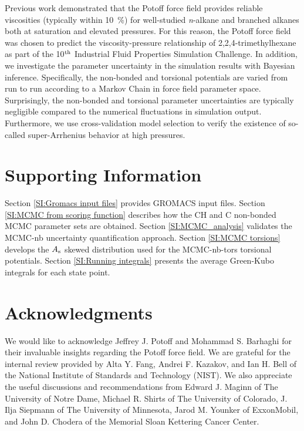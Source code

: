 \documentclass[preprint,review,12pt]{elsarticle}
\begin{document}
    Previous work demonstrated that the Potoff force field provides reliable viscosities (typically within 10~\%) for well-studied \textit{n}-alkane and branched alkanes both at saturation and elevated pressures. For this reason, the Potoff force field was chosen to predict the viscosity-pressure relationship of 2,2,4-trimethylhexane as part of the 10$^{\rm th}$ Industrial Fluid Properties Simulation Challenge. In addition, we investigate the parameter uncertainty in the simulation results with Bayesian inference. Specifically, the non-bonded and torsional potentials are varied from run to run according to a Markov Chain in force field parameter space. Surprisingly, the non-bonded and torsional parameter uncertainties are typically negligible compared to the numerical fluctuations in simulation output. Furthermore, we use cross-validation model selection to verify the existence of so-called super-Arrhenius behavior at high pressures.
	
	\section*{Supporting Information}
	
    Section \ref{SI:Gromacs input files} provides GROMACS input files. Section \ref{SI:MCMC from scoring function} describes how the CH and C non-bonded MCMC parameter sets are obtained. Section \ref{SI:MCMC_analysis} validates the MCMC-nb uncertainty quantification approach. Section \ref{SI:MCMC torsions} develops the $A_{\rm s}$ skewed distribution used for the MCMC-nb-tors torsional potentials. Section \ref{SI:Running integrals} presents the average Green-Kubo integrals for each state point.      
	
	\section*{Acknowledgments}
	
	We would like to acknowledge Jeffrey J. Potoff and Mohammad S. Barhaghi for their invaluable insights regarding the Potoff force field. We are grateful for the internal review provided by Alta Y. Fang, Andrei F. Kazakov, and Ian H. Bell of the National Institute of Standards and Technology (NIST). We also appreciate the useful discussions and recommendations from Edward J. Maginn of The University of Notre Dame, Michael R. Shirts of The University of Colorado, J. Ilja Siepmann of The University of Minnesota, Jarod M. Younker of ExxonMobil, and John D. Chodera of the Memorial Sloan Kettering Cancer Center. 
	
\end{document}
